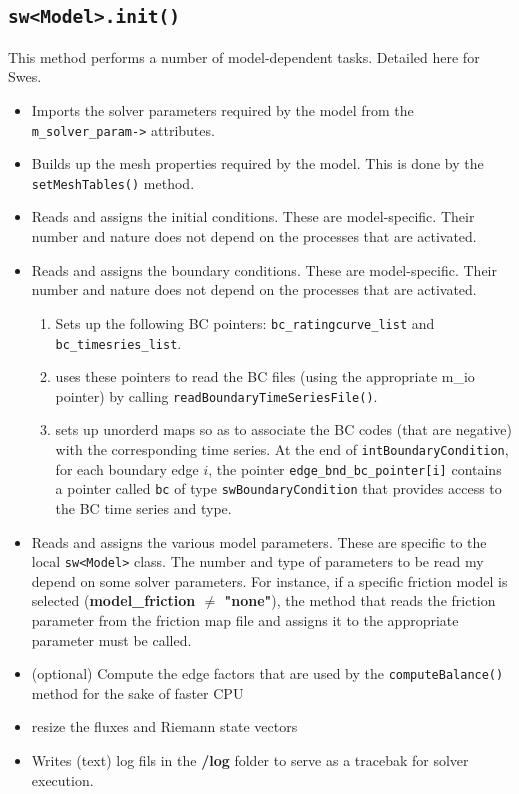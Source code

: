 \subsection{\texttt{sw<Model>.init()}}
This method performs a number of model-dependent tasks. Detailed here for Swes.
\begin{itemize}
%
\item Imports the solver parameters required by the model from the \texttt{m\_solver\_param->} attributes.
%
\item Builds up the mesh properties required by the model. This is done by the \texttt{setMeshTables()} method.
%
\item Reads and assigns the initial conditions. These are model-specific. Their number and nature does not depend on the processes that are activated.
%
\item Reads and assigns the boundary conditions. These are model-specific. Their number and nature does not depend on the processes that are activated. 
%
\begin{enumerate}
\item Sets up the following BC pointers: \texttt{bc\_ratingcurve\_list} and \texttt{bc\_timesries\_list}.
\item uses these pointers to read the BC files (using the appropriate m\_io pointer) by calling \texttt{readBoundaryTimeSeriesFile()}.
\item sets up unorderd maps so as to associate the BC codes (that are negative) with the corresponding time series. At the end of \texttt{intBoundaryCondition}, for each boundary edge $i$, the pointer \texttt{edge\_bnd\_bc\_pointer[i]} contains a pointer called \texttt{bc} of type \texttt{swBoundaryCondition} that provides access to the BC time series and type.
\end{enumerate}
%
\item Reads and assigns the various model parameters. These are specific to the local \texttt{sw<Model>} class. The number and type of parameters to be read my depend on some solver parameters. For instance, if a specific friction model is selected (\textbf{model\_friction $\neq$ "none"}), the method that reads the friction parameter from the friction map file and assigns it to the appropriate parameter must be called.
%
\item (optional) Compute the edge factors that are used by the \texttt{computeBalance()} method for the sake of faster CPU
%
\item resize the fluxes and Riemann state vectors
%
\item Writes (text) log fils in the \textbf{/log} folder to serve as a tracebak for solver execution.
\end{itemize}
